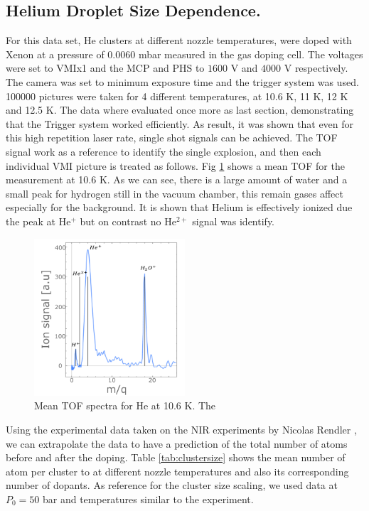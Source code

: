 \subsection{Helium Droplet Size Dependence.}

For this data set, He clusters at different nozzle temperatures, were doped with Xenon at a pressure of $0.0060$ mbar measured in the gas doping cell. The voltages were set to VMIx1  and the MCP and PHS to $1600$ V and $4000$ V respectively. The camera was set to minimum exposure time and the trigger system was used. 100000 pictures were taken for 4 different temperatures, at 10.6 K, 11 K, 12 K and 12.5 K. The data where evaluated once more as last section, demonstrating that the Trigger system worked efficiently. As result, it was shown that even for this high repetition laser rate, single shot signals can be achieved. The TOF signal work as a reference to identify the single explosion, and then each individual VMI picture is treated as follows. Fig \ref{fig:tofhe} shows a mean TOF for the measurement at 10.6 K. As we can see, there is a large amount of water and a small peak for hydrogen still in the vacuum chamber, this remain gases affect especially for the background. It is shown that Helium is effectively ionized due the peak at He$^{+}$ but on contrast no He$^{2+}$ signal was identify.

\begin{figure}[hbtp]
\centering
\includegraphics[width=0.5\textwidth]{../Images/results/Mir_He_Dropletsize/tof.png}
\caption[MIR TOF spectra He ]{Mean TOF spectra for He at 10.6 K. The }
\label{fig:tofhe}
\end{figure}

Using the experimental data taken on the NIR experiments by Nicolas Rendler \cite{rendler_einzelschuss_2017}, we can extrapolate the data to have a prediction of the total number of atoms before and after the doping. Table \ref{tab:clustersize} shows the mean number of atom per cluster to at different nozzle temperatures and also its corresponding number of dopants. As reference for the cluster size scaling, we used data at $P_{0}=50$ bar and temperatures similar to the experiment. 

